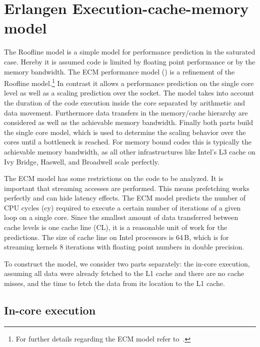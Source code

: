 \section{Erlangen Execution-cache-memory model}
\label{sec:ecm}

The Roofline model is a simple model
for performance prediction in the saturated case.
Hereby it is assumed code is limited by floating point performance or by the
memory bandwidth.
The ECM performance model (\cite{treibig-2010-ecm,hager-2012-ecm}) is a refinement
of the Roofline model.\footnote{For further details regarding the ECM model refer
to~\cite{stengel-2015}.}
In contrast it allows a performance prediction on the single core level as well
as a scaling prediction over the socket.
The model takes into account the duration of the code execution inside the core
separated by arithmetic and data movement.
Furthermore data transfers in the memory/cache hierarchy are considered as well
as the achievable memory bandwidth.
%
Finally both parts build the single core model, which is used to determine the
scaling behavior over the cores until a bottleneck is reached. 
%
For memory bound codes this is typically the achievable memory bandwidth, as all
other infrastructures like Intel's L3 cache on Ivy Bridge, Haswell, and Broadwell
scale perfectly. 

The ECM model has some restrictions on the code to be analyzed.
It is important that streaming accesses are performed. This means prefetching
works perfectly and can hide latency effects.
The ECM model predicts the number of CPU cycles (cy) required to execute a certain number of iterations of a given loop on a single core. Since the smallest amount of data transferred between cache levels is one cache line (CL), it is a reasonable unit of work for the predictions. The size of cache line on Intel processors is 64\,B, which is for streaming kernels 8 iterations with floating point numbers in double precision.

To construct the model, we consider two parts separately: the in-core execution, assuming all data were already fetched to the L1 cache and there are no cache misses, and the time to fetch the data from its location to the L1 cache.

\subsection*{In-core execution}

